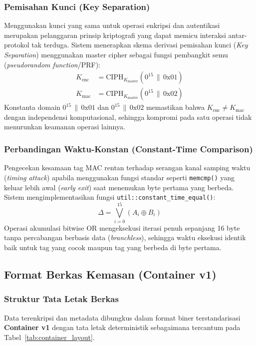 \subsubsection{Pemisahan Kunci (Key Separation)}
Menggunakan kunci yang sama untuk operasi enkripsi dan autentikasi merupakan pelanggaran prinsip kriptografi yang dapat memicu interaksi antar-protokol tak terduga. Sistem menerapkan skema derivasi pemisahan kunci (\textit{Key Separation}) menggunakan master cipher sebagai fungsi pembangkit semu (\textit{pseudorandom function}/PRF):
\begin{align*}
K_{\text{enc}} &= \text{CIPH}_{K_{\text{master}}}(0^{15} \,\|\, \text{0x01}) \\
K_{\text{mac}} &= \text{CIPH}_{K_{\text{master}}}(0^{15} \,\|\, \text{0x02})
\end{align*}
Konstanta domain $0^{15} \,\|\, \text{0x01}$ dan $0^{15} \,\|\, \text{0x02}$ memastikan bahwa $K_{\text{enc}} \neq K_{\text{mac}}$ dengan independensi komputasional, sehingga kompromi pada satu operasi tidak menurunkan keamanan operasi lainnya.

\subsubsection{Perbandingan Waktu-Konstan (Constant-Time Comparison)}
Pengecekan kesamaan tag MAC rentan terhadap serangan kanal samping waktu (\textit{timing attack}) apabila menggunakan fungsi standar seperti \texttt{memcmp()} yang keluar lebih awal (\textit{early exit}) saat menemukan byte pertama yang berbeda. Sistem mengimplementasikan fungsi \texttt{util::constant\_time\_equal()}:
\[
\Delta = \bigvee_{i=0}^{15} (A_i \oplus B_i)
\]
Operasi akumulasi bitwise OR mengeksekusi iterasi penuh sepanjang 16 byte tanpa percabangan berbasis data (\textit{branchless}), sehingga waktu eksekusi identik baik untuk tag yang cocok maupun tag yang berbeda di byte pertama.

\subsection{Format Berkas Kemasan (Container v1)}

\subsubsection{Struktur Tata Letak Berkas}
Data terenkripsi dan metadata dibungkus dalam format biner terstandarisasi \textbf{Container v1} dengan tata letak deterministik sebagaimana tercantum pada Tabel~\ref{tab:container_layout}.


